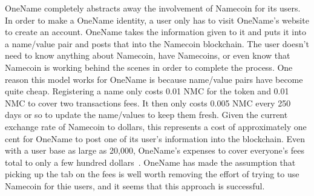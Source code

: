 OneName completely abstracts away the involvement of Namecoin for its users. In order to make a OneName identity, a user only has to visit OneName's website to create an account. OneName takes the information given to it and puts it into a name/value pair and posts that into the Namecoin blockchain. The user doesn't need to know anything about Namecoin, have Namecoins, or even know that Namecoin is working behind the scenes in order to complete the process. One reason this model works for OneName is because name/value pairs have become quite cheap. Registering a name only costs 0.01 NMC for the token and 0.01 NMC to cover two transactions fees. It then only costs 0.005 NMC every 250 days or so to update the name/values to keep them fresh. Given the current exchange rate of Namecoin to dollars, this represents a cost of approximately one cent for OneName to post one of its user's information into the blockchain. Even with a user base as large as 20,000, OneName's expenses to cover everyone's fees total to only a few hundred dollars~\cite{exchangerate}. OneName has made the assumption that picking up the tab on the fees is well worth removing the effort of trying to use Namecoin for thie users, and it seems that this approach is successful.
